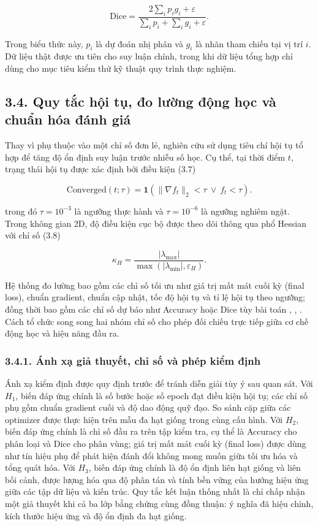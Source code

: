\documentclass[a4paper,12pt]{article}
\begin{document}
\begin{equation}
\mathrm{Dice}=\frac{2\sum_i p_i g_i+\varepsilon}{\sum_i p_i+\sum_i g_i+\varepsilon}.\tag{3.6}
\end{equation}

Trong biểu thức này, $p_i$ là dự đoán nhị phân và $g_i$ là nhãn tham chiếu tại vị trí $i$. Dữ liệu thật được ưu tiên cho suy luận chính, trong khi dữ liệu tổng hợp chỉ dùng cho mục tiêu kiểm thử kỹ thuật quy trình thực nghiệm.

\subsection{3.4. Quy tắc hội tụ, đo lường động học và chuẩn hóa đánh giá}

Thay vì phụ thuộc vào một chỉ số đơn lẻ, nghiên cứu sử dụng tiêu chí hội tụ tổ hợp để tăng độ ổn định suy luận trước nhiễu số học. Cụ thể, tại thời điểm $t$, trạng thái hội tụ được xác định bởi điều kiện (3.7)

\begin{equation}
\mathrm{Converged}(t;\tau)=\mathbf{1}\left(\|\nabla f_t\|_2<\tau\ \lor\ f_t<\tau\right).\tag{3.7}
\end{equation}

trong đó $\tau=10^{-3}$ là ngưỡng thực hành và $\tau=10^{-6}$ là ngưỡng nghiêm ngặt. Trong không gian 2D, độ điều kiện cục bộ được theo dõi thông qua phổ Hessian với chỉ số (3.8)

\begin{equation}
\kappa_H=\frac{|\lambda_{\max}|}{\max(|\lambda_{\min}|,\varepsilon_H)}.\tag{3.8}
\end{equation}

Hệ thống đo lường bao gồm các chỉ số tối ưu như giá trị mất mát cuối kỳ (final loss), chuẩn gradient, chuẩn cập nhật, tốc độ hội tụ và tỉ lệ hội tụ theo ngưỡng; đồng thời bao gồm các chỉ số dự báo như Accuracy hoặc Dice tùy bài toán \cite{ref8}, \cite{ref14}, \cite{ref15}. Cách tổ chức song song hai nhóm chỉ số cho phép đối chiếu trực tiếp giữa cơ chế động học và hiệu năng đầu ra.

\subsubsection{3.4.1. Ánh xạ giả thuyết, chỉ số và phép kiểm định}

Ánh xạ kiểm định được quy định trước để tránh diễn giải tùy ý sau quan sát. Với $H_1$, biến đáp ứng chính là số bước hoặc số epoch đạt điều kiện hội tụ; các chỉ số phụ gồm chuẩn gradient cuối và độ dao động quỹ đạo. So sánh cặp giữa các optimizer được thực hiện trên mẫu đa hạt giống trong cùng cấu hình. Với $H_2$, biến đáp ứng chính là chỉ số đầu ra trên tập kiểm tra, cụ thể là Accuracy cho phân loại và Dice cho phân vùng; giá trị mất mát cuối kỳ (final loss) được dùng như tín hiệu phụ để phát hiện đánh đổi không mong muốn giữa tối ưu hóa và tổng quát hóa. Với $H_3$, biến đáp ứng chính là độ ổn định liên hạt giống và liên bối cảnh, được lượng hóa qua độ phân tán và tính bền vững của hướng hiệu ứng giữa các tập dữ liệu và kiến trúc. Quy tắc kết luận thống nhất là chỉ chấp nhận một giả thuyết khi cả ba lớp bằng chứng cùng đồng thuận: ý nghĩa đã hiệu chỉnh, kích thước hiệu ứng và độ ổn định đa hạt giống.
\end{document}
